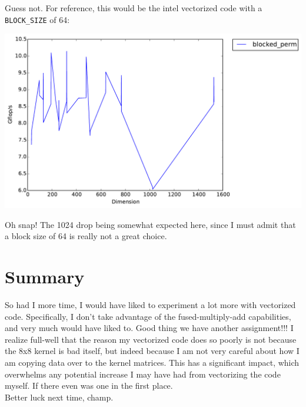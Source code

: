 \documentclass[11pt]{article}
\begin{document}
\noindent Guess not.  For reference, this would be the intel vectorized code with a \texttt{BLOCK\_SIZE} of 64:

\begin{center}
    \includegraphics[scale=0.5]{benchmarking/hand-vectorized/naive_64.pdf}
\end{center}

\noindent Oh snap!  The 1024 drop being somewhat expected here, since I must admit that a block size of 64 is really not a great choice.

\section{Summary}

\noindent So had I more time, I would have liked to experiment a lot more with vectorized code.  Specifically, I don't take advantage of the fused-multiply-add capabilities, and very much would have liked to.  Good thing we have another assignment!!!  I realize full-well that the reason my vectorized code does so poorly is not because the 8x8 kernel is bad itself, but indeed because I am not very careful about how I am copying data over to the kernel matrices.  This has a significant impact, which overwhelms any potential increase I may have had from vectorizing the code myself.  If there even was one in the first place.\\

\noindent Better luck next time, champ.
\end{document}

